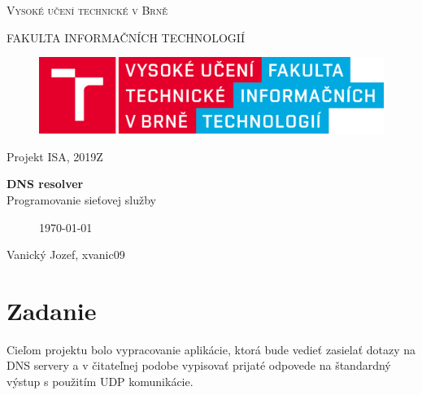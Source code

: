 \documentclass[a4paper,11pt]{article}
\begin{document}

\begin{titlepage}
\begin{center}
    {\Huge \textsc{Vysoké učení technické v Brně}}
    
    {\LARGE \uppercase{FAKULTA INFORMAČNÍCH TECHNOLOGIÍ}}
    
\begin{figure}[h]
\vspace{5.0cm}
\centering
\includegraphics[scale=0.15]{logo.png}
\vspace{-10.0cm}
\end{figure}
    
	{\LARGE Projekt ISA, 2019Z}

	{\Huge \textbf{DNS resolver}}
\\

{\LARGE {Programovanie sieťovej služby}}\\

\begin{figure}[h]
\centering
{\Large {\mydate\today}}
\vspace{6cm}
\end{figure}

\end{center}
\begin{compactitem}
\item[] Vanický Jozef, xvanic09
\end{compactitem}

\end{titlepage}

\tableofcontents
\newpage

\section{Zadanie}
Cieľom projektu bolo vypracovanie aplikácie, ktorá bude vedieť zasielať dotazy na DNS servery a v čitateľnej podobe vypisovať prijaté odpovede na štandardný výstup s použitím UDP komunikácie.
\end{document}
